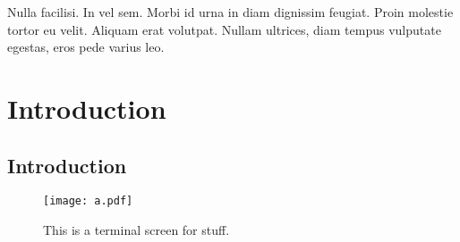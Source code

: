 \graphicspath{{figures/chapter-1/}}


\begin{savequote}[75mm]
Nulla facilisi. In vel sem. Morbi id urna in diam dignissim feugiat. Proin molestie tortor eu velit. Aliquam erat volutpat. Nullam    ultrices, diam tempus vulputate egestas, eros pede varius leo.
\end{savequote}

\chapter{Introduction}
	\label{chapter:introduction}


\section{Introduction}

\lipsum[1-6]\cite{Mao}

\begin{figure}[h]
\texttt{[image: a.pdf]}
\caption[This is a short caption]{This is a terminal screen for stuff.\cite{Mao}}
\end{figure}


